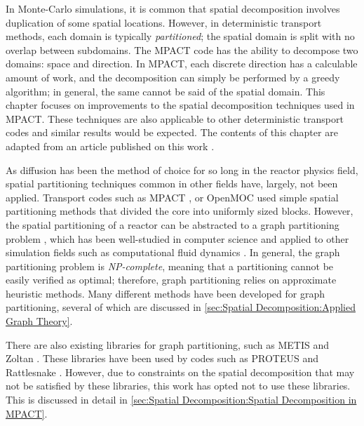 {{    In Monte-Carlo simulations, it is common that spatial decomposition involves duplication of some spatial locations.
    However, in deterministic transport methods, each domain is typically \emph{partitioned};
    the spatial domain is split with no overlap between subdomains.
    The MPACT \cite{MPACT2016} code has the ability to decompose two domains: space and direction.
    In MPACT, each discrete direction has a calculable amount of work, and the decomposition can simply be performed by a greedy algorithm; in general, the same cannot be said of the spatial domain.
    This chapter focuses on improvements to the spatial decomposition techniques used in MPACT.
    These techniques are also applicable to other deterministic transport codes and similar results would be expected.
    The contents of this chapter are adapted from an article published on this work \cite{Fitzgerald2019a}.

    As diffusion has been the method of choice for so long in the reactor physics field, spatial partitioning techniques common in other fields have, largely, not been applied.
    Transport codes such as MPACT \cite{MPACT2016}, or OpenMOC \cite{Gunow2018} used simple spatial partitioning methods that divided the core into uniformly sized blocks.
    However, the spatial partitioning of a reactor can be abstracted to a graph partitioning problem \cite{Fitzgerald2017}, which has been well-studied in computer science \cite{Elsner1997} and applied to other simulation fields such as computational fluid dynamics \cite{Yao1998}.
    In general, the graph partitioning problem is \emph{NP-complete}, meaning that a partitioning cannot be easily verified as optimal; therefore, graph partitioning relies on approximate heuristic methods.
    Many different methods have been developed for graph partitioning, several of which are discussed in \cref{sec:Spatial Decomposition:Applied Graph Theory}.

    There are also existing libraries for graph partitioning, such as METIS\cite{METIS} and Zoltan \cite{Boman2012}.
    These libraries have been used by codes such as PROTEUS and Rattlesnake \cite{Marin-Lafleche2013,Rattlesnake}.
    However, due to constraints on the spatial decomposition that may not be satisfied by these libraries, this work has opted not to use these libraries.
    This is discussed in detail in \cref{sec:Spatial Decomposition:Spatial Decomposition in MPACT}.

}}
